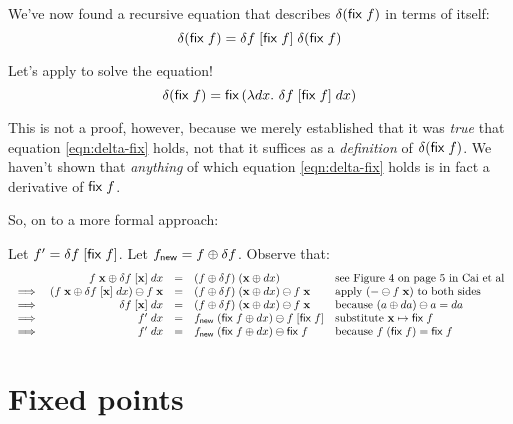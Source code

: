\documentclass{article}
\begin{document}
We've now found a recursive equation that describes
$\delta(\mathsf{fix}\;f)$ in terms of itself:
\begin{equation}\label{eqn:delta-fix}
  \delta(\mathsf{fix}\;f) = \delta f \;[{\mathsf{fix}\; f}] \; \delta(\mathsf{fix}\;f)
\end{equation}

Let's apply  to solve the equation!
\begin{equation}
  \delta(\mathsf{fix}\; f)
  = \mathsf{fix}\,(\lambda dx.\,\, \delta f \;[{\mathsf{fix}\;f}] \;dx)
\end{equation}

This is not a proof, however, because we merely established that it was
\emph{true} that equation \ref{eqn:delta-fix} holds, not that it suffices as a
\emph{definition} of $\delta(\mathsf{fix}\;f)$. We haven't shown that
\emph{anything} of which equation \ref{eqn:delta-fix} holds is in fact a
derivative of $\mathsf{fix}\;f$. 

So, on to a more formal approach:

Let $f' = \delta{f} \;[{\mathsf{fix}\; f}]$.
Let $f_{\mathsf{new}} = f \oplus \delta f$.
Observe that:
\[\begin{array}{rrcll}
  &   f\;\mathbf{x} \oplus \delta f \;[{\mathbf{x}}] \;dx
  &=& (f \oplus \delta f) \; (\mathbf{x} \oplus dx)
  & \text{see Figure 4 on page 5 in Cai et al}
  \\ \implies&
  (f\;\mathbf{x} \oplus \delta f \; [{\mathbf{x}}] \; dx) \ominus f\;\mathbf{x}
  &=&
  (f \oplus \delta f) \; (\mathbf{x} \oplus dx) \ominus f\;\mathbf{x}
  & \text{apply $(- \ominus f\;\mathbf{x})$ to both sides}
  \\ \implies&
  \delta f \; [{\mathbf{x}}] \; dx
  &=&
  (f \oplus \delta f) \; (\mathbf{x} \oplus dx) \ominus f\;\mathbf{x}
  & \text{because}~(a \oplus da) \ominus a = da
  \\ \implies&
  f' \; dx
  &=& f_{\mathsf{new}} \; (\mathsf{fix}\;f \oplus dx)
      \ominus f\; [{\mathsf{fix}\; f}]
  & \text{substitute $\mathbf{x} \mapsto \mathsf{fix}\;f$}
  \\ \implies&
  f' \; dx
  &=& f_{\mathsf{new}} \; (\mathsf{fix}\;f \oplus dx)
      \ominus \mathsf{fix}\; f
  & \text{because}~f\;(\mathsf{fix}\;f) = \mathsf{fix}\;f
\end{array}\]


\section{Fixed points}
\end{document}
